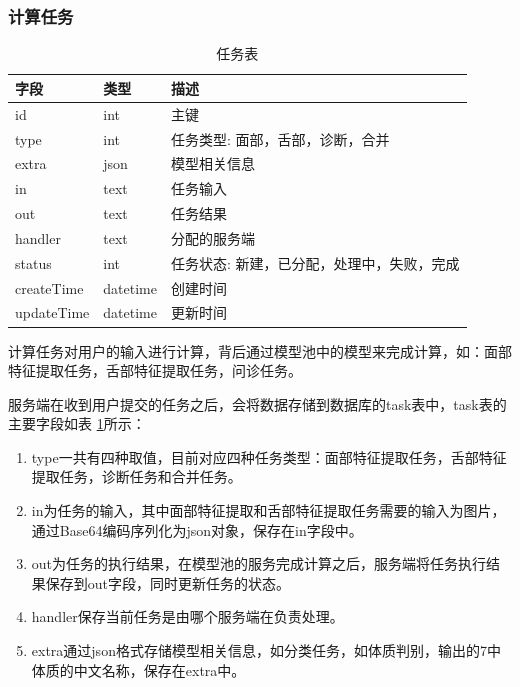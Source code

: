 \subsubsection{计算任务}
\begin{table}[]
    \centering
    \begin{tabular}{lll}
        \toprule
        字段 & 类型 & 描述 \\ 
        \midrule
        id & int & 主键 \\
        type & int & 任务类型: 面部，舌部，诊断，合并 \\ 
        extra & json & 模型相关信息 \\
        in & text & 任务输入 \\
        out & text & 任务结果 \\
        handler & text & 分配的服务端 \\
        status & int & 任务状态: 新建，已分配，处理中，失败，完成 \\
        createTime & datetime & 创建时间 \\
        updateTime & datetime & 更新时间\\
        \bottomrule
    \end{tabular}
    \caption{任务表}
    \label{tab:task}
\end{table}
计算任务对用户的输入进行计算，背后通过模型池中的模型来完成计算，如：面部特征提取任务，舌部特征提取任务，问诊任务。

服务端在收到用户提交的任务之后，会将数据存储到数据库的task表中，task表的主要字段如表 \ref{tab:task}所示：

\begin{enumerate}
    
    \item type一共有四种取值，目前对应四种任务类型：面部特征提取任务，舌部特征提取任务，诊断任务和合并任务。

    \item in为任务的输入，其中面部特征提取和舌部特征提取任务需要的输入为图片，通过Base64编码序列化为json对象，保存在in字段中。

    \item out为任务的执行结果，在模型池的服务完成计算之后，服务端将任务执行结果保存到out字段，同时更新任务的状态。

    \item  handler保存当前任务是由哪个服务端在负责处理。

    \item extra通过json格式存储模型相关信息，如分类任务，如体质判别，输出的7中体质的中文名称，保存在extra中。
\end{enumerate}


